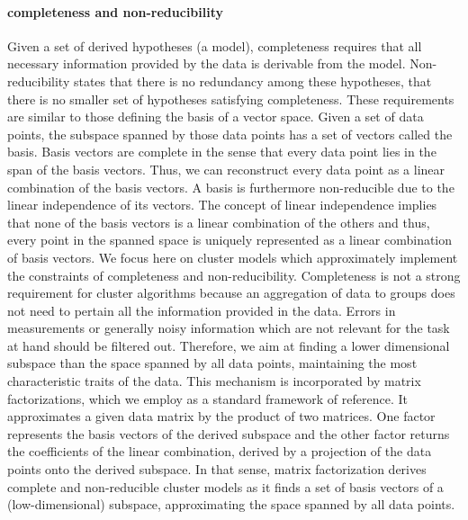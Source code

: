 \paragraph{completeness and non-reducibility} Given a set of derived hypotheses (a model), completeness requires that all necessary information provided by the data is derivable from the model. Non-reducibility states that there is no redundancy among these hypotheses, that there is no smaller set of hypotheses satisfying completeness. These requirements are similar to those defining the basis of a vector space. Given a set of data points, the subspace spanned by those data points has a set of vectors called the basis. Basis vectors are complete in the sense that every data point lies in the span of the basis vectors. Thus, we can reconstruct every data point as a linear combination of the basis vectors. A basis is furthermore non-reducible due to the linear independence of its vectors. The concept of linear independence implies that none of the basis vectors is a linear combination of the others and thus, every point in the spanned space is uniquely represented as a linear combination of basis vectors. 
We focus here on cluster models which approximately implement the constraints of completeness and non-reducibility.  Completeness is not a strong requirement for cluster algorithms because an aggregation of data to groups does not need to pertain all the information provided in the data. Errors in measurements or generally noisy information which are not relevant for the task at hand should be filtered out. Therefore, we aim at finding a lower dimensional subspace than the space spanned by all data points, maintaining the most characteristic traits of the data. This mechanism is incorporated by matrix factorizations, which we employ as a standard framework of reference. It approximates a given data matrix by the product of two matrices. One factor represents the basis vectors of the derived subspace and the other factor returns the coefficients of the linear combination, derived by a projection of the data points onto the derived subspace. In that sense, matrix factorization derives complete and non-reducible cluster models as it finds a set of basis vectors of a (low-dimensional) subspace, approximating the space spanned by all data points.

